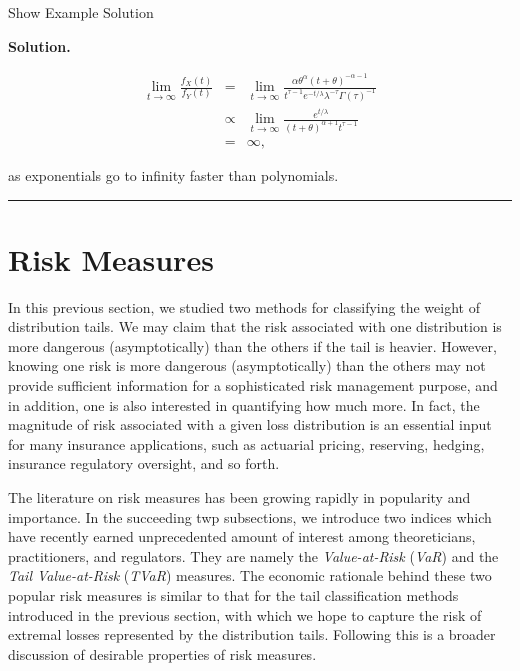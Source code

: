 \documentclass[]{book}
\theoremstyle{definition}
\theoremstyle{definition}
\theoremstyle{definition}
\theoremstyle{remark}
\begin{document}
Show Example Solution

\hypertarget{toggleExamplePortMgt.1.5}{}
\textbf{Solution.}

\begin{eqnarray*}
    \lim_{t\to \infty} \frac{f_{X}(t)}{f_{Y}(t)} &=& \lim_{t \to \infty} \frac{\alpha \theta^{\alpha} (t+ \theta)^{-\alpha-1}}{t^{\tau-1} e^{-t/\lambda} \lambda^{-\tau} \Gamma(\tau)^{-1}} \\
 &\propto&  \lim_{t\to \infty} \frac{e^{t/\lambda}}{(t+\theta)^{\alpha+1} t^{\tau-1}} \\
    &=& \infty,
\end{eqnarray*}

as exponentials go to infinity faster than polynomials.

\begin{center}\rule{0.5\linewidth}{\linethickness}\end{center}

\section{Risk Measures}\label{S:RiskMeasure}

In this previous section, we studied two methods for classifying the
weight of distribution tails. We may claim that the risk associated with
one distribution is more dangerous (asymptotically) than the others if
the tail is heavier. However, knowing one risk is more dangerous
(asymptotically) than the others may not provide sufficient information
for a sophisticated risk management purpose, and in addition, one is
also interested in quantifying how much more. In fact, the magnitude of
risk associated with a given loss distribution is an essential input for
many insurance applications, such as actuarial pricing, reserving,
hedging, insurance regulatory oversight, and so forth.

The literature on risk measures has been growing rapidly in popularity
and importance. In the succeeding twp subsections, we introduce two
indices which have recently earned unprecedented amount of interest
among theoreticians, practitioners, and regulators. They are namely the
\emph{Value-at-Risk} (\emph{VaR}) and the \emph{Tail Value-at-Risk}
(\emph{TVaR}) measures. The economic rationale behind these two popular
risk measures is similar to that for the tail classification methods
introduced in the previous section, with which we hope to capture the
risk of extremal losses represented by the distribution tails. Following
this is a broader discussion of desirable properties of risk measures.
\end{document}
